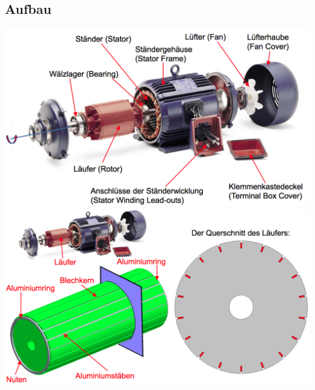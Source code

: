 \subsection{Aufbau}
\begin{minipage}{0.4 \linewidth}
\includegraphics[width = \linewidth]{./Pics/VL1213/Aufbau}
\includegraphics[width = \linewidth]{./Pics/VL1213/Aufbau3}
\end{minipage}
